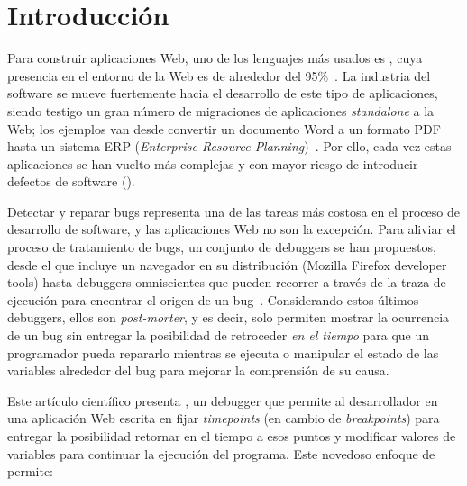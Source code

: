 \documentclass[conference]{IEEEtran}
\begin{document}
\section{Introducci\'on}
\label{sec:intro}

Para construir aplicaciones Web, uno de los lenguajes m\'as usados es \javascript, cuya presencia en el entorno de la Web es de alrededor del 95\%~\cite{jsuses}. La industria del software se mueve fuertemente hacia el desarrollo de este tipo de aplicaciones, siendo testigo un gran n\'umero de migraciones de aplicaciones {\em standalone} a la Web; los ejemplos van desde convertir un documento Word a un formato PDF~\cite{smallpdf} hasta un sistema ERP ({\em Enterprise Resource Planning})~\cite{erpOrcale}. Por ello, cada vez estas aplicaciones se han vuelto m\'as complejas y con mayor riesgo de introducir defectos de software (). 

Detectar y reparar bugs representa una de las tareas m\'as costosa en el proceso de desarrollo de software, y las aplicaciones Web no son la excepci\'on. Para aliviar el proceso de tratamiento de bugs, un conjunto de debuggers se han propuestos, desde el que incluye un navegador en su distribuci\'on (\eg Mozilla Firefox developer tools) hasta  debuggers omniscientes que pueden recorrer a trav\'es de la traza de ejecuci\'on para encontrar el origen de un bug~\cite{azar:2016,barrAl:fse2016}. Considerando estos \'ultimos debuggers, ellos son {\em post-morter}, y es decir, solo permiten mostrar la ocurrencia de un bug sin entregar la posibilidad de retroceder {\em en el tiempo} para que un programador pueda repararlo mientras se ejecuta o manipular el estado de las variables alrededor del bug para mejorar la comprensi\'on de su causa.       

Este art\'iculo cient\'ifico presenta \deloreanjs, un debugger que permite al desarrollador en una aplicaci\'on Web escrita en \javascript fijar {\em timepoints} (en cambio de {\em breakpoints}) para entregar la posibilidad retornar en el tiempo a esos puntos y modificar valores de variables para continuar la ejecuci\'on del programa. Este novedoso enfoque de \deloreanjs permite:    
\end{document}
